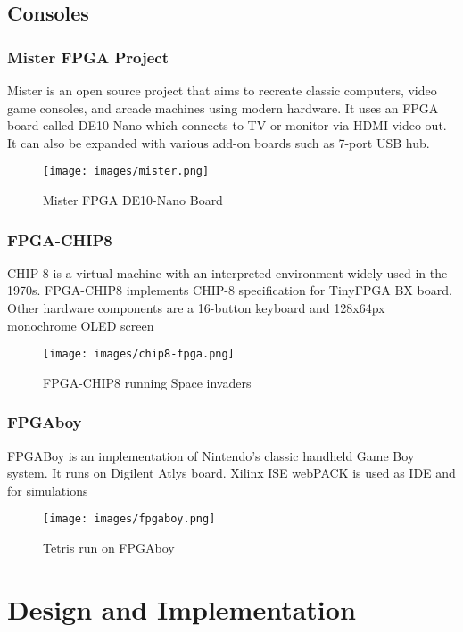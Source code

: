 \documentclass[a4paper,12pt]{article}
\begin{document}
    \subsection{Consoles}

    \subsubsection{Mister FPGA Project}
    Mister is an open source project that aims to recreate classic computers, video game consoles, and arcade machines using modern hardware. It uses an FPGA board called DE10-Nano which connects to TV or monitor via HDMI video out. It can also be expanded with various add-on boards such as 7-port USB hub.

    \begin{figure}[h]
    \centering
    \texttt{[image: images/mister.png]} 
    \caption{Mister FPGA DE10-Nano Board}
    \end{figure}

    \subsubsection{FPGA-CHIP8} 
    CHIP-8 is a virtual machine with an interpreted environment widely used in the 1970s.
    FPGA-CHIP8 implements CHIP-8 specification for TinyFPGA BX board. Other hardware components are a 16-button keyboard and 128x64px monochrome OLED screen
    \newpage
    \begin{figure}[h]
    \centering
    \texttt{[image: images/chip8-fpga.png]} 
    \caption{FPGA-CHIP8 running Space invaders}
    \end{figure}

    \subsubsection{FPGAboy} 
    FPGABoy is an implementation of Nintendo's classic handheld Game Boy system. It runs on Digilent Atlys board. Xilinx ISE webPACK is used as IDE and for simulations
    \begin{figure}[h]
    \centering
    \texttt{[image: images/fpgaboy.png]} 
    \caption{Tetris run on FPGAboy}
    \end{figure} 
    \newpage
    \section{Design and Implementation}
\end{document}
